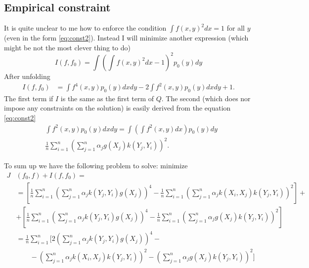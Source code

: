 \documentclass[10pt]{article}
\begin{document}
\subsection{Empirical constraint}
It is quite unclear to me how to enforce the condition $\int f(x,y)^2dx =1$ for all $y$ (even in the form \eqref{eq:const2}). Instead I will minimize another expression (which might be not the most clever thing to do)
\begin{equation}
 I(f,f_0) = \int \left( \int f(x,y)^2 dx -1 \right)^2 p_0(y) dy
\end{equation}
After unfolding
\begin{align}
 I(f,f_0) &= \int f^4(x,y) p_0(y) dx dy - 2 \int f^2(x,y) p_0(y) dx dy +1.
\end{align}
The first term if $I$ is the same as the first term of $Q$. The second (which does nor impose any constraints on the solution) is easily derived from the equation \eqref{eq:const2} 
\begin{align}
 &\int f^2(x,y) p_0(y) dx dy =  \int \left ( \int f^2(x,y) dx \right ) p_0(y)  dy\\ 
 &\frac 1 n \sum_{i=1}^n \left( \sum_{j=1}^{n} \alpha_j  g(X_{j})  k(Y_{j},Y_i) \right )^2 .
\end{align}

To sum up we have the following problem to solve: minimize 
\begin{align}
 J&(f_0,f) +I(f,f_0) = \\
 &=\left[  \frac 1 n \sum_{i=1}^{n} \left( \sum_{j=1}^{n} \alpha_j k(Y_j,Y_i) g(X_j) \right)^4 - \frac 1 n \sum_{i=1}^n \left( \sum_{j=1}^{n} \alpha_j k(X_i,X_j) k(Y_j,Y_i) \right)^2 \right] + \\
 &+ \left[  \frac 1 n \sum_{i=1}^{n} \left( \sum_{j=1}^{n} \alpha_j k(Y_j,Y_i) g(X_j) \right)^4 - \frac 1 n \sum_{i=1}^n \left( \sum_{j=1}^{n} \alpha_j  g(X_{j})  k(Y_{j},Y_i) \right )^2 \right] \\
 &=  \frac 1 n \sum_{i=1}^{n}   \Bigg [ 2 \left( \sum_{j=1}^{n} \alpha_j k(Y_j,Y_i) g(X_j) \right)^4 - \\
  & \quad \quad -\left( \sum_{j=1}^{n} \alpha_j k(X_i,X_j) k(Y_j,Y_i) \right)^2 - \left( \sum_{j=1}^{n} \alpha_j  g(X_{j})  k(Y_{j},Y_i) \right )^2 \Bigg]   
\end{align}
\end{document}
